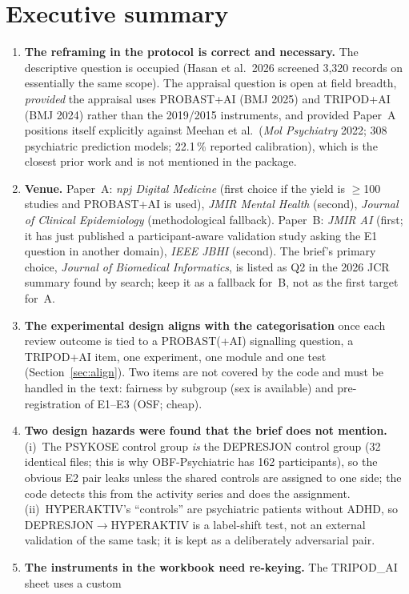 \documentclass[11pt,a4paper]{article}
\begin{document}
\section{Executive summary}
\begin{enumerate}
\item \textbf{The reframing in the protocol is correct and necessary.} The descriptive question is
occupied (Hasan et al.\ 2026 screened 3{,}320 records on essentially the same scope). The
appraisal question is open at field breadth, \emph{provided} the appraisal uses PROBAST+AI (BMJ
2025) and TRIPOD+AI (BMJ 2024) rather than the 2019/2015 instruments, and provided Paper~A
positions itself explicitly against Meehan et al.\ (\emph{Mol Psychiatry} 2022; 308 psychiatric
prediction models; 22.1\,\% reported calibration), which is the closest prior work and is not
mentioned in the package.
\item \textbf{Venue.} Paper~A: \emph{npj Digital Medicine} (first choice if the yield is
$\geq$100 studies and PROBAST+AI is used), \emph{JMIR Mental Health} (second), \emph{Journal of
Clinical Epidemiology} (methodological fallback). Paper~B: \emph{JMIR AI} (first; it has just
published a participant-aware validation study asking the E1 question in another domain),
\emph{IEEE JBHI} (second). The brief's primary choice, \emph{Journal of Biomedical Informatics},
is listed as Q2 in the 2026 JCR summary found by search; keep it as a fallback for~B, not as the
first target for~A.
\item \textbf{The experimental design aligns with the categorisation} once each review outcome is
tied to a PROBAST(+AI) signalling question, a TRIPOD+AI item, one experiment, one module and one
test (Section~\ref{sec:align}). Two items are not covered by the code and must be handled in the
text: fairness by subgroup (sex is available) and pre-registration of E1--E3 (OSF; cheap).
\item \textbf{Two design hazards were found that the brief does not mention.} (i)~The PSYKOSE
control group \emph{is} the DEPRESJON control group (32 identical files; this is why OBF-Psychiatric
has 162 participants), so the obvious E2 pair leaks unless the shared controls are assigned to one
side; the code detects this from the activity series and does the assignment. (ii)~HYPERAKTIV's
``controls'' are psychiatric patients without ADHD, so DEPRESJON$\rightarrow$HYPERAKTIV is a label-shift
test, not an external validation of the same task; it is kept as a deliberately adversarial pair.
\item \textbf{The instruments in the workbook need re-keying.} The TRIPOD\_AI sheet uses a custom

\end{enumerate}
\end{document}
